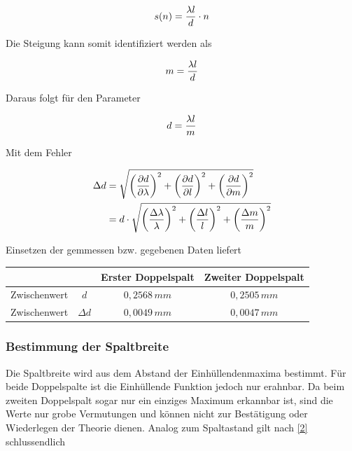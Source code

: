 \documentclass{article}
\begin{document}
\begin{align}
s(n) =  \frac{\lambda l}{d} \cdot n
\notag
\end{align}

Die Steigung kann somit identifiziert werden als

\begin{align}
m =  \frac{\lambda l}{d}
\notag
\end{align}

Daraus folgt für den Parameter

\begin{align}
d =  \frac{\lambda l}{m}
\notag
\end{align}

Mit dem Fehler

\begin{align}
\Delta d &= \sqrt{
\left( \frac{\partial d}{\partial \lambda} \right)^2 +
\left( \frac{\partial d}{\partial l} \right)^2 +
\left( \frac{\partial d}{\partial m} \right)^2
} \notag \\
&=  d \cdot \sqrt{
\left( \frac{\Delta \lambda}{\lambda} \right)^2 +
\left( \frac{\Delta l}{l} \right)^2 +
\left( \frac{\Delta m}{m} \right)^2
}
\notag
\end{align}

Einsetzen der gemmessen bzw. gegebenen Daten liefert

\begin{center}
\begin{tabular}{c|c c c }
	&					& Erster Doppelspalt & Zweiter Doppelspalt \\ \hline
	Zwischenwert & \(d\)		& \( 0,2568\, mm\)	& \( 0,2505\, mm \) \\  
	Zwischenwert & \(\Delta d\)	& \( 0,0049\, mm\)	& \( 0,0047\, mm \)\\

\end{tabular}
\end{center}

\subsubsection{Bestimmung der Spaltbreite}

Die Spaltbreite wird aus dem Abstand der Einhüllendenmaxima bestimmt. Für beide Doppelspalte ist die Einhüllende Funktion jedoch nur erahnbar. Da beim zweiten Doppelspalt sogar nur ein einziges Maximum erkannbar ist, sind die Werte nur grobe Vermutungen und können nicht zur Bestätigung oder Wiederlegen der Theorie dienen.
Analog zum Spaltastand gilt nach \eqref{2} schlussendlich
\end{document}
